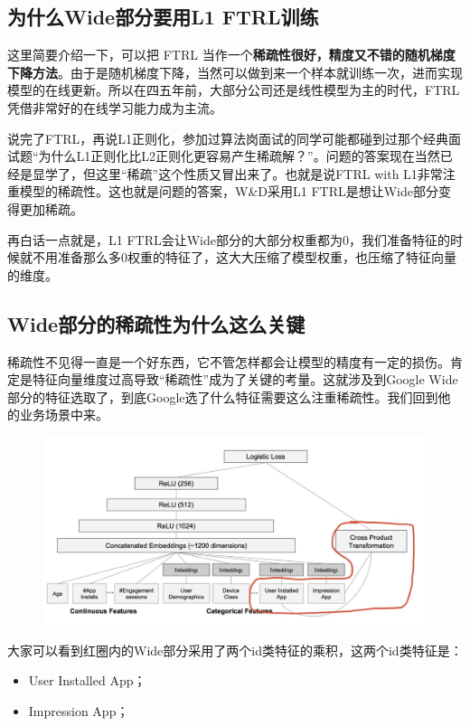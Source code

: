 \documentclass[12pt]{article}
\begin{document}
\subsection{为什么Wide部分要用L1 FTRL训练}
这里简要介绍一下，可以把 FTRL 当作一个\textbf{稀疏性很好，精度又不错的随机梯度下降方法}。由于是随机梯度下降，当然可以做到来一个样本就训练一次，进而实现模型的在线更新。所以在四五年前，大部分公司还是线性模型为主的时代，FTRL凭借非常好的在线学习能力成为主流。

说完了FTRL，再说L1正则化，参加过算法岗面试的同学可能都碰到过那个经典面试题“为什么L1正则化比L2正则化更容易产生稀疏解？”。问题的答案现在当然已经是显学了，但这里“稀疏”这个性质又冒出来了。也就是说FTRL with L1非常注重模型的稀疏性。这也就是问题的答案，W\&D采用L1 FTRL是想让Wide部分变得更加稀疏。

再白话一点就是，L1 FTRL会让Wide部分的大部分权重都为0，我们准备特征的时候就不用准备那么多0权重的特征了，这大大压缩了模型权重，也压缩了特征向量的维度。

\subsection{Wide部分的稀疏性为什么这么关键}
稀疏性不见得一直是一个好东西，它不管怎样都会让模型的精度有一定的损伤。肯定是特征向量维度过高导致“稀疏性”成为了关键的考量。这就涉及到Google Wide部分的特征选取了，到底Google选了什么特征需要这么注重稀疏性。我们回到他的业务场景中来。
\begin{figure}[H]
    \centering
    \includegraphics[width=1\textwidth]{fig/Wide_Deep_Structure_Detail.png}
\end{figure}

大家可以看到红圈内的Wide部分采用了两个id类特征的乘积，这两个id类特征是：
\begin{itemize}
\setlength{\itemsep}{0pt}
\setlength{\parsep}{0pt}
\setlength{\parskip}{0pt}
    \item User Installed App；
    \item Impression App；
\end{itemize}
\end{document}

